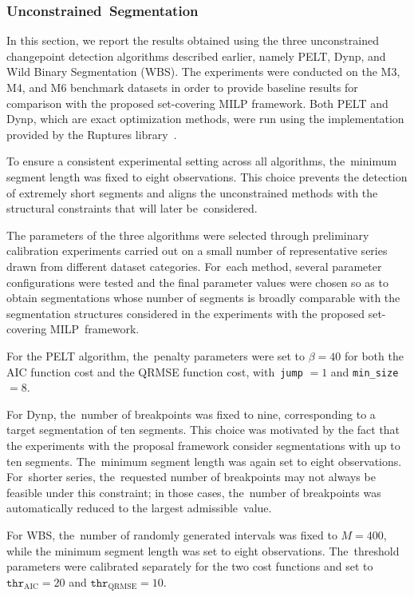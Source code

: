 \documentclass[mathematics,article,accept,pdftex,moreauthors]{Definitions/mdpi}
\begin{document}
\subsubsection{Unconstrained~Segmentation}

In this section, we report the results obtained using the three unconstrained changepoint detection algorithms described earlier, namely PELT, Dynp, and Wild Binary Segmentation (WBS). 
The experiments were conducted on the M3, M4, and M6 benchmark datasets in order to provide baseline results for comparison with the proposed set-covering MILP framework. Both PELT and Dynp, which are exact optimization methods, were run using the implementation provided by the Ruptures library~\cite{rupweb}.

To ensure a consistent experimental setting across all algorithms, the~minimum segment length was fixed to eight observations. 
This choice prevents the detection of extremely short segments and aligns the unconstrained methods with the structural constraints that will later be~considered.

The parameters of the three algorithms were selected through preliminary calibration experiments carried out on a small number of representative series drawn from different dataset categories. For~each method, several parameter configurations were tested and the final parameter values were chosen so as to obtain segmentations whose number of segments is broadly comparable with the segmentation structures considered in the experiments with the proposed set-covering MILP~framework.

For the PELT algorithm, the~penalty parameters were set to $\beta=40$ for both the AIC function cost and the QRMSE function cost, with~\texttt{jump} $=1$ and \texttt{min\_size} $=8$.  

For Dynp, the~number of breakpoints was fixed to nine, corresponding to a target segmentation of ten segments. This choice was motivated by the fact that the experiments with the proposal framework consider segmentations with up to ten segments. The~minimum segment length was again set to eight observations. For~shorter series, the~requested number of breakpoints may not always be feasible under this constraint; in those cases, the~number of breakpoints was automatically reduced to the largest admissible~value.

For WBS, the~number of randomly generated intervals was fixed to $M=400$, while the minimum segment length was set to eight observations. The~threshold parameters were calibrated separately for the two cost functions and set to $\texttt{thr}_{\text{AIC}}=20$ and $\texttt{thr}_{\text{QRMSE}}=10$. 
\end{document}
